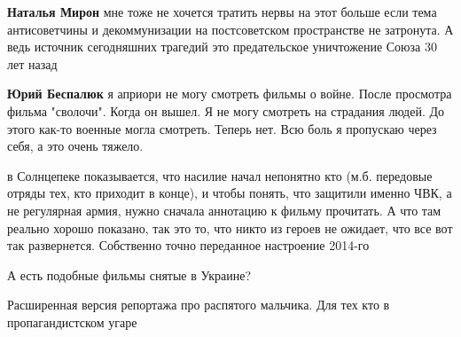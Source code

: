 \begin{itemize}
\begin{itemize}
\textbf{Наталья Мирон} мне тоже не хочется тратить нервы на этот больше если тема антисоветчины и декоммунизации на постсоветском пространстве не затронута. А ведь источник сегодняшних трагедий это предательское уничтожение Союза 30 лет назад

 
\textbf{Юрий Беспалюк} я априори не могу смотреть фильмы о войне. После просмотра фильма "сволочи". Когда он вышел. Я не могу смотреть на страдания людей. До этого как-то военные могла смотреть. Теперь нет. Всю боль я пропускаю через себя, а это очень тяжело.
\end{itemize}

 

в Солнцепеке показывается, что насилие начал непонятно кто (м.б. передовые
отряды тех, кто приходит в конце), и чтобы понять, что защитили именно ЧВК, а
не регулярная армия, нужно сначала аннотацию к фильму прочитать. А что там
реально хорошо показано, так это то, что никто из героев не ожидает, что все
вот так развернется. Собственно точно переданное настроение 2014-го


 
А есть подобные фильмы снятые в Украине?

 

Расширенная версия репортажа про распятого мальчика. Для тех кто в
пропагандистском угаре

\begin{itemize}
 

\end{itemize}
\end{itemize}
